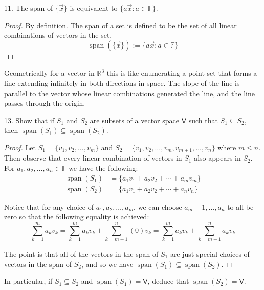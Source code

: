 \documentclass[11pt]{article}
\newcommand{\br}[1]{\left(#1\right)}
\newcommand{\cbr}[1]{\{#1\}}
\DeclareMathOperator{\Span}{span}
\begin{document}
11. The span of $\cbr{\vec{x}}$ is equivalent to $\cbr{a\vec{x} : a\in\mathbb{F}}$.
\begin{proof}
    By definition. The span of a set is defined to be the set of all linear combinations of vectors in the set.
    $$\Span\br{\cbr{\vec{x}}} := \cbr{a\vec{x} : a\in\mathbb{F}}$$
\end{proof}

Geometrically for a vector in $\mathbb{R}^3$ this is like enumerating a point set that forms a line extending infinitely in both directions in space. The slope of the line is parallel to the vector whose linear combinations generated the line, and the line passes through the origin.

13. Show that if $S_1$ and $S_2$ are subsets of a vector space $\mathsf{V}$ such that $S_1\subseteq S_2$, then $\Span(S_1)\subseteq \Span(S_2)$.

\begin{proof}
    Let $S_1 = \cbr{v_1,v_2,\dots,v_m}$ and $S_2 = \cbr{v_1,v_2,\dots,v_m,v_{m+1},\dots,v_n}$ where $m \leq n$. Then observe that every linear combination of vectors in $S_1$ also appears in $S_2$. For $a_1,a_2,\dots,a_n\in\mathbb{F}$ we have the following:
    \begin{align*}
        \Span\br{S_1} &= \cbr{a_1v_1 + a_2v_2 + \cdots + a_mv_m} \\
        \Span\br{S_2} &= \cbr{a_1v_1 + a_2v_2 + \cdots + a_nv_n}
    \end{align*}

    Notice that for any choice of $a_1,a_2,\dots,a_m$, we can choose $a_m+1,\dots,a_n$ to all be zero so that the following equality is achieved:
    $$\sum_{k=1}^m a_kv_k = \sum_{k=1}^m a_kv_k + \sum_{k=m+1}^n (0)v_k = \sum_{k=1}^m a_kv_k + \sum_{k=m+1}^n a_kv_k$$

    The point is that all of the vectors in the span of $S_1$ are just special choices of vectors in the span of $S_2$, and so we have $\Span(S_1)\subseteq \Span(S_2)$.
\end{proof}

In particular, if $S_1\subseteq S_2$ and $\Span(S_1) = \mathsf{V}$, deduce that $\Span(S_2) = \mathsf{V}$.
\end{document}
